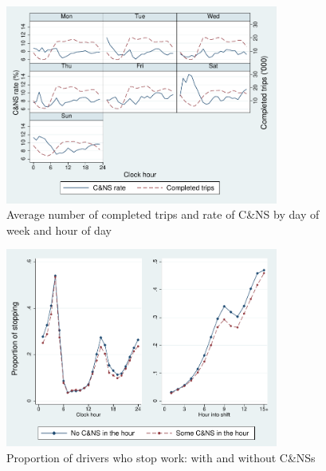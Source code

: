 \documentclass[reviewmode]{restud}
\begin{document}
\begin{figure}
	\centering
	\includegraphics[width=0.8\textwidth]{./fg/dowplot.pdf}
	\caption{Average number of completed trips and rate of C\&NS by day of week and hour of day}
	\label{fg:trips}
\end{figure}


\begin{figure}
	{\centering
		\includegraphics[width=0.8\textwidth]{./fg/modelfree_quit_vert.pdf}
		\caption{Proportion of drivers who stop work: with and without C\&NSs}
		\label{fg:quitbyhour}
	}
\end{figure}
\end{document}
